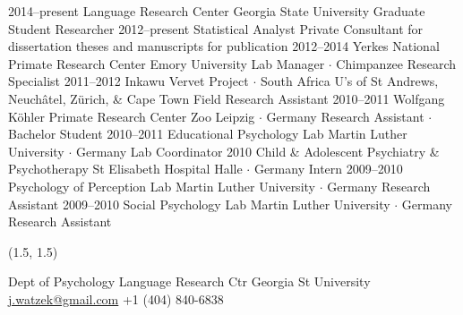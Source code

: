\documentclass[]{friggeri-cv}
\begin{document}
\begin{entrylist}
  \entry
    {2014--present}
    {Language Research Center}
    {Georgia State University}
    {Graduate Student Researcher}
  \entry
    {2012--present}
    {Statistical Analyst}
    {Private}
    {Consultant for dissertation theses and manuscripts for publication}
  \entry
    {2012--2014}
    {Yerkes National Primate Research Center}
    {Emory University}
    {Lab Manager $\cdot$ Chimpanzee Research Specialist}
  \entry
    {2011--2012}
    {Inkawu Vervet Project $\cdot$ South Africa}
    {U's of St Andrews, Neuch\^{a}tel, Z\"urich, \& Cape Town}
    {Field Research Assistant}
  \entry
    {2010--2011}
    {Wolfgang K\"{o}hler Primate Research Center}
    {Zoo Leipzig $\cdot$ Germany}
    {Research Assistant $\cdot$ Bachelor Student}
  \entry
    {2010--2011}
    {Educational Psychology Lab}
    {Martin Luther University $\cdot$ Germany}
    {Lab Coordinator}
  \entry
    {2010}
    {Child \& Adolescent Psychiatry \& Psychotherapy}
    {St Elisabeth Hospital Halle $\cdot$ Germany}
    {Intern}
  \entry
    {2009--2010}
    {Psychology of Perception Lab}
    {Martin Luther University $\cdot$ Germany}
    {Research Assistant}
  \entry
    {2009--2010}
    {Social Psychology Lab}
    {Martin Luther University $\cdot$ Germany}
    {Research Assistant}
\end{entrylist}


\renewenvironment{aside}{%
  \let\oldsection\section
  \renewcommand{\section}[1]{
    \par\vspace{\baselineskip}{\Large\headingfont\color{headercolor} ##1}
  }
  \begin{textblock}{3.6}(1.5, 1.5)
  \begin{flushright}
  \obeycr
}{%
  \restorecr
  \end{flushright}
  \end{textblock}
  \let\section\oldsection
}


\begin{aside}
  \section{{\normalfont julia}watzek}
    Dept of Psychology
    Language Research Ctr
    Georgia St University
    ~
    \href{mailto:j.watzek@gmail.com}{j.watzek@gmail.com}
    +1 (404) 840-6838
\end{aside}
\end{document}
